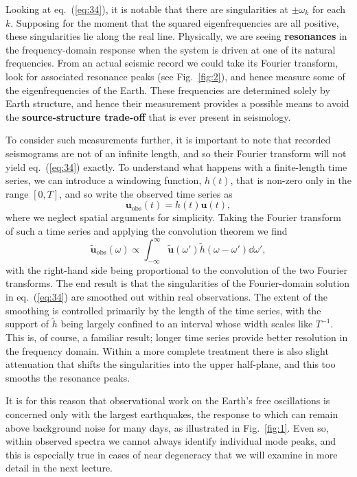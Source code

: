 Looking at eq.~(\ref{eq:34}), it is notable that there are singularities at $\pm\omega_{k}$ for each $k$. Supposing for the moment
that the squared eigenfrequencies are all positive, these singularities lie along the real line. Physically, we are seeing
\textbf{resonances} in the frequency-domain response when the system is driven at one of its natural frequencies. From an actual seismic 
record we could take its Fourier transform, look for associated resonance peaks (see Fig.~\ref{fig:2}), and hence measure some of the eigenfrequencies 
of the Earth. These frequencies are determined solely by Earth structure, and hence their measurement provides a possible
means to avoid the \textbf{source-structure trade-off} that is ever present in seismology.

To consider such measurements further, it is important to note that recorded seismograms are not of an infinite length, and so their Fourier 
transform will not yield eq.~(\ref{eq:34}) exactly. To understand what happens with a finite-length time series, we can introduce a windowing function, $h(t)$, that is non-zero only in the 
range $[0,T]$, and so write the observed time series as
\begin{equation}
\mathbf{u}_{\mathrm{obs}}(t)=h(t)\mathbf{u}(t),
\label{eq:35}
\end{equation}
where we neglect spatial arguments for simplicity. Taking the Fourier transform of such a time series and applying the convolution theorem we find
\begin{equation}
\tilde{\mathbf{u}}_{\mathrm{obs}}(\omega)\propto\int_{-\infty}^{\infty}\tilde{\mathbf{u}}(\omega')\tilde{h}(\omega-\omega')\dd\omega',
\label{eq:36}
\end{equation}
with the right-hand side being proportional to the convolution of the two Fourier transforms. The end result is that the singularities of the 
Fourier-domain solution in eq.~(\ref{eq:34}) are smoothed out within real observations. The extent of the smoothing is controlled primarily by the 
length of the time series, with the support of $\tilde{h}$ being largely confined to an interval whose width scales like $T^{-1}$. This is, of 
course, a familiar result; longer time series provide better resolution in the frequency domain. Within a more complete treatment there 
is also slight attenuation that shifts the singularities into the upper half-plane, and this too smooths the resonance peaks. 

It is for this reason that observational work on the Earth's free oscillations is concerned only with the largest earthquakes, the response 
to which can remain above background noise for many days, as illustrated in Fig.~\ref{fig:1}. Even so, within observed spectra we cannot always identify individual mode peaks, and 
this is especially true in cases of near degeneracy that we will examine in more detail in the next lecture.

